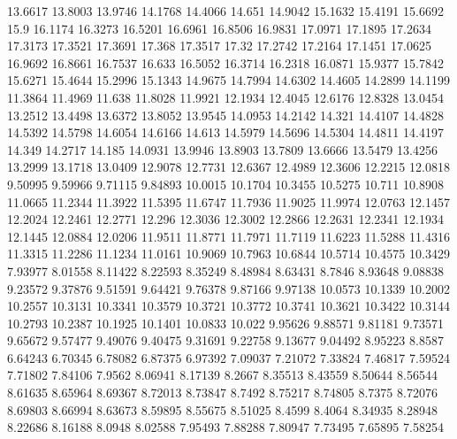 13.6617      13.8003      13.9746      14.1768      14.4066      14.651      14.9042      15.1632      15.4191      15.6692      15.9      16.1174      16.3273      16.5201      16.6961      16.8506      16.9831      17.0971      17.1895      17.2634      17.3173      17.3521      17.3691      17.368      17.3517      17.32      17.2742      17.2164      17.1451      17.0625      16.9692      16.8661      16.7537      16.633      16.5052      16.3714      16.2318      16.0871      15.9377      15.7842      15.6271      15.4644      15.2996      15.1343      14.9675      14.7994      14.6302      14.4605      14.2899      14.1199      
11.3864      11.4969      11.638      11.8028      11.9921      12.1934      12.4045      12.6176      12.8328      13.0454      13.2512      13.4498      13.6372      13.8052      13.9545      14.0953      14.2142      14.321      14.4107      14.4828      14.5392      14.5798      14.6054      14.6166      14.613      14.5979      14.5696      14.5304      14.4811      14.4197      14.349      14.2717      14.185      14.0931      13.9946      13.8903      13.7809      13.6666      13.5479      13.4256      13.2999      13.1718      13.0409      12.9078      12.7731      12.6367      12.4989      12.3606      12.2215      12.0818      
9.50995      9.59966      9.71115      9.84893      10.0015      10.1704      10.3455      10.5275      10.711      10.8908      11.0665      11.2344      11.3922      11.5395      11.6747      11.7936      11.9025      11.9974      12.0763      12.1457      12.2024      12.2461      12.2771      12.296      12.3036      12.3002      12.2866      12.2631      12.2341      12.1934      12.1445      12.0884      12.0206      11.9511      11.8771      11.7971      11.7119      11.6223      11.5288      11.4316      11.3315      11.2286      11.1234      11.0161      10.9069      10.7963      10.6844      10.5714      10.4575      10.3429      
7.93977      8.01558      8.11422      8.22593      8.35249      8.48984      8.63431      8.7846      8.93648      9.08838      9.23572      9.37876      9.51591      9.64421      9.76378      9.87166      9.97138      10.0573      10.1339      10.2002      10.2557      10.3131      10.3341      10.3579      10.3721      10.3772      10.3741      10.3621      10.3422      10.3144      10.2793      10.2387      10.1925      10.1401      10.0833      10.022      9.95626      9.88571      9.81181      9.73571      9.65672      9.57477      9.49076      9.40475      9.31691      9.22758      9.13677      9.04492      8.95223      8.8587      
6.64243      6.70345      6.78082      6.87375      6.97392      7.09037      7.21072      7.33824      7.46817      7.59524      7.71802      7.84106      7.9562      8.06941      8.17139      8.2667      8.35513      8.43559      8.50644      8.56544      8.61635      8.65964      8.69367      8.72013      8.73847      8.7492      8.75217      8.74805      8.7375      8.72076      8.69803      8.66994      8.63673      8.59895      8.55675      8.51025      8.4599      8.4064      8.34935      8.28948      8.22686      8.16188      8.0948      8.02588      7.95493      7.88288      7.80947      7.73495      7.65895      7.58254      
